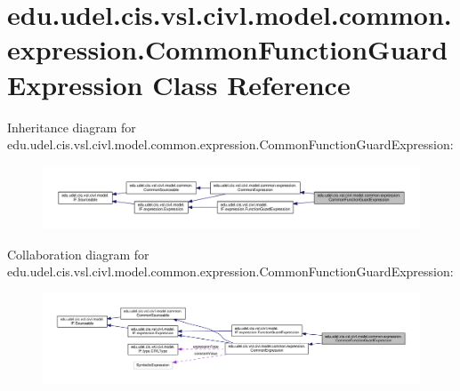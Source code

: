 \hypertarget{classedu_1_1udel_1_1cis_1_1vsl_1_1civl_1_1model_1_1common_1_1expression_1_1CommonFunctionGuardExpression}{}\section{edu.\+udel.\+cis.\+vsl.\+civl.\+model.\+common.\+expression.\+Common\+Function\+Guard\+Expression Class Reference}
\label{classedu_1_1udel_1_1cis_1_1vsl_1_1civl_1_1model_1_1common_1_1expression_1_1CommonFunctionGuardExpression}


Inheritance diagram for edu.\+udel.\+cis.\+vsl.\+civl.\+model.\+common.\+expression.\+Common\+Function\+Guard\+Expression\+:
\nopagebreak
\begin{figure}[H]
\begin{center}
\leavevmode
\includegraphics[width=350pt]{classedu_1_1udel_1_1cis_1_1vsl_1_1civl_1_1model_1_1common_1_1expression_1_1CommonFunctionGuardExpression__inherit__graph}
\end{center}
\end{figure}


Collaboration diagram for edu.\+udel.\+cis.\+vsl.\+civl.\+model.\+common.\+expression.\+Common\+Function\+Guard\+Expression\+:
\nopagebreak
\begin{figure}[H]
\begin{center}
\leavevmode
\includegraphics[width=350pt]{classedu_1_1udel_1_1cis_1_1vsl_1_1civl_1_1model_1_1common_1_1expression_1_1CommonFunctionGuardExpression__coll__graph}
\end{center}
\end{figure}
